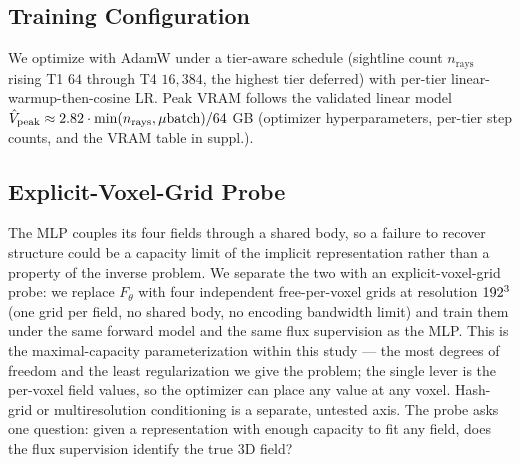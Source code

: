 \subsection{Training Configuration}
We optimize with AdamW under a tier-aware schedule (sightline count $n_{\text{rays}}$ rising T1 $64$ through T4 $16{,}384$, the highest tier deferred) with per-tier linear-warmup-then-cosine LR. Peak VRAM follows the validated linear model $\hat{V}_{\text{peak}}\approx2.82\cdot\min(n_{\text{rays}},\mu\text{batch})/64$ GB (optimizer hyperparameters, per-tier step counts, and the VRAM table in suppl.).

\subsection{Explicit-Voxel-Grid Probe}
\label{sec:method:gridprobe}
The MLP couples its four fields through a shared body, so a failure to recover structure could be a capacity limit of the implicit representation rather than a property of the inverse problem. We separate the two with an explicit-voxel-grid probe: we replace $F_\theta$ with four independent free-per-voxel grids at resolution $192^3$ (one grid per field, no shared body, no encoding bandwidth limit) and train them under the same forward model and the same flux supervision as the MLP. This is the maximal-capacity parameterization within this study --- the most degrees of freedom and the least regularization we give the problem; the single lever is the per-voxel field values, so the optimizer can place any value at any voxel. Hash-grid or multiresolution conditioning is a separate, untested axis. The probe asks one question: given a representation with enough capacity to fit any field, does the flux supervision identify the true 3D field?
